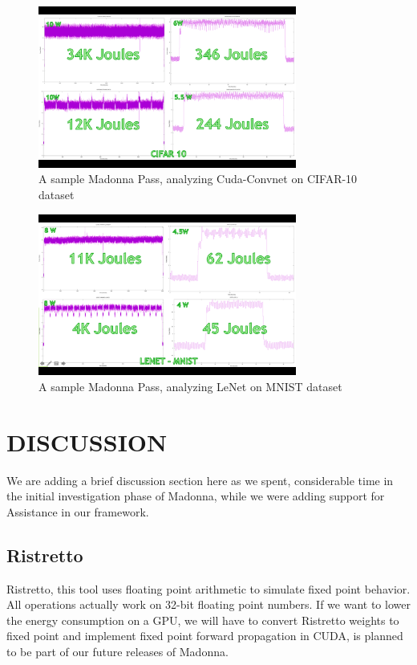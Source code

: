\documentclass[letterpaper, 10 pt, conference]{ieeeconf}
\begin{document}
          \begin{figure}[h]
              \centering
              \includegraphics[width=85mm,scale=1]{cifar10.png}
              \caption{A sample Madonna Pass, analyzing Cuda-Convnet on CIFAR-10 dataset}
              \label{fig:cifar}
          \end{figure}
          
          \begin{figure}[h]
              \centering
              \includegraphics[width=85mm,scale=1]{lenet.png}
              \caption{A sample Madonna Pass, analyzing LeNet on MNIST dataset}
              \label{fig:lenet}
          \end{figure}


\section{DISCUSSION}

We are adding a brief discussion section here as we spent, considerable time in the initial 
investigation phase of Madonna, while we were adding support for Assistance in our framework.

\subsection{Ristretto} Ristretto, this tool uses floating point arithmetic to simulate
fixed point behavior. 
All operations actually work on 32-bit floating point numbers.
If we want to lower the energy consumption on a GPU, we will have to convert Ristretto
weights to fixed point and implement fixed point forward propagation in CUDA, is planned to be
part of our future releases of Madonna.
\end{document}
